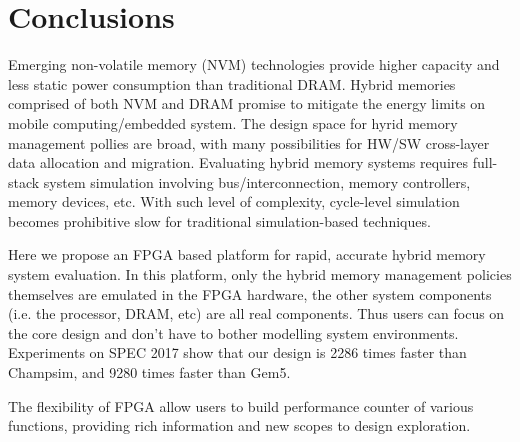 \documentclass[conference]{IEEEtran}
\begin{document}
\section{Conclusions}
\label{sec:conc}
Emerging non-volatile memory (NVM) technologies provide higher
capacity and less static power consumption than traditional DRAM. Hybrid memories comprised of both NVM and DRAM
promise to mitigate the energy limits on mobile computing/embedded system. The design space for hyrid memory management pollies are broad, with many
possibilities for HW/SW cross-layer data allocation and migration.
Evaluating hybrid memory systems requires full-stack system simulation involving bus/interconnection, memory controllers, memory devices, etc. With such level of complexity, cycle-level simulation becomes  prohibitive slow for traditional simulation-based techniques.\par
  Here we propose an FPGA based platform for rapid, accurate
hybrid memory system evaluation.  In this platform, only the hybrid
memory management policies themselves are emulated in the FPGA
hardware, the other system components (i.e. the processor, DRAM, etc)
are all real components.  Thus users can focus on the core design and don't have to bother modelling system environments.
Experiments on SPEC 2017 show that our design is 2286 times faster than Champsim, and 9280 times faster than Gem5. \par
The flexibility of FPGA allow users to build performance counter of various functions, providing rich information and new scopes to design exploration.


\end{document}
